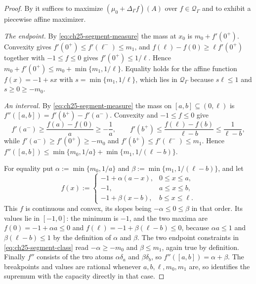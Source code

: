 \begin{proof}
By  it suffices to maximize
$(\mu_0+\Delta_\Gamma f)(A)$ over $f\in\mathcal Q_\Gamma$ and to exhibit
a piecewise affine maximizer.

\emph{The endpoint.}  By \eqref{eq:ch25-segment-measure} the mass at $x_0$
is $m_0+f'(0^+)$.  Convexity gives
$f'(0^+)\leq f'(\ell^-)\leq m_1$, and
$f(\ell)-f(0)\geq\ell f'(0^+)$ together with $-1\leq f\leq0$ gives
$f'(0^+)\leq1/\ell$.  Hence
$m_0+f'(0^+)\leq m_0+\min\{m_1,1/\ell\}$.  Equality holds for the affine
function $f(x)=-1+sx$ with $s=\min\{m_1,1/\ell\}$, which lies in
$\mathcal Q_\Gamma$ because $s\ell\leq1$ and $s\geq0\geq-m_0$.

\emph{An interval.}  By \eqref{eq:ch25-segment-measure} the mass on
$[a,b]\subseteq(0,\ell)$ is $f''([a,b])=f'(b^+)-f'(a^-)$.  Convexity and
$-1\leq f\leq0$ give
\[
 f'(a^-)\geq\frac{f(a)-f(0)}{a}\geq-\frac1a,
 \qquad
 f'(b^+)\leq\frac{f(\ell)-f(b)}{\ell-b}\leq\frac1{\ell-b},
\]
while $f'(a^-)\geq f'(0^+)\geq-m_0$ and
$f'(b^+)\leq f'(\ell^-)\leq m_1$.  Hence
$f''([a,b])\leq\min\{m_0,1/a\}+\min\{m_1,1/(\ell-b)\}$.

For equality put $\alpha:=\min\{m_0,1/a\}$ and
$\beta:=\min\{m_1,1/(\ell-b)\}$, and let
\[
 f(x):=\begin{cases}
  -1+\alpha(a-x),&0\leq x\leq a,\\
  -1,&a\leq x\leq b,\\
  -1+\beta(x-b),&b\leq x\leq\ell .
 \end{cases}
\]
This $f$ is continuous and convex, its slopes being
$-\alpha\leq0\leq\beta$ in that order.  Its values lie in $[-1,0]$: the
minimum is $-1$, and the two maxima are $f(0)=-1+\alpha a\leq0$ and
$f(\ell)=-1+\beta(\ell-b)\leq0$, because $\alpha a\leq1$ and
$\beta(\ell-b)\leq1$ by the definition of $\alpha$ and $\beta$.  The
two endpoint constraints in \eqref{eq:ch25-segment-class} read
$-\alpha\geq-m_0$ and $\beta\leq m_1$, again true by definition.
Finally $f''$ consists of the two atoms $\alpha\delta_a$ and
$\beta\delta_b$, so $f''([a,b])=\alpha+\beta$.  The breakpoints and
values are rational whenever $a,b,\ell,m_0,m_1$ are, so
 identifies the supremum with the
capacity directly in that case.


\end{proof}
